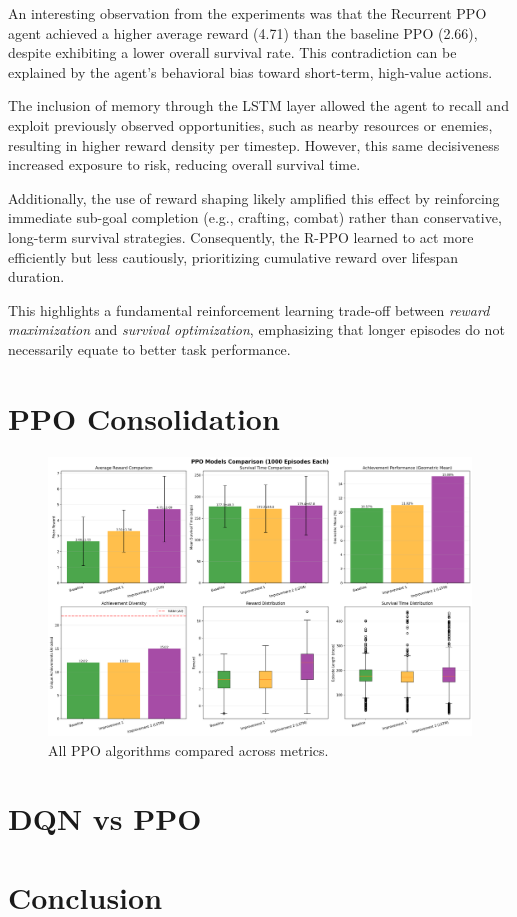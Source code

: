 \documentclass[twocolumn]{article}
\begin{document}
An interesting observation from the experiments was that the Recurrent PPO  agent achieved a higher average reward (4.71) than the baseline PPO (2.66), despite exhibiting a lower overall survival rate. This contradiction can be explained by the agent's behavioral bias toward short-term, high-value actions.

The inclusion of memory through the LSTM layer allowed the agent to recall and exploit previously observed opportunities, such as nearby resources or enemies, resulting in higher reward density per timestep. However, this same decisiveness increased exposure to risk, reducing overall survival time.

Additionally, the use of reward shaping likely amplified this effect by reinforcing immediate sub-goal completion (e.g., crafting, combat) rather than conservative, long-term survival strategies. Consequently, the R-PPO learned to act more efficiently but less cautiously, prioritizing cumulative reward over lifespan duration.

This highlights a fundamental reinforcement learning trade-off between \textit{reward maximization} and \textit{survival optimization}, emphasizing that longer episodes do not necessarily equate to better task performance.

\section*{PPO Consolidation}
\begin{figure}[H]
    \centering
    \includegraphics[width=0.75\linewidth]{images/final_comparison_1000_episodes.png}
    \caption{All PPO algorithms compared across metrics.}
    \label{fig:placeholder}
\end{figure}

\section*{DQN vs PPO}
\section*{Conclusion}
\printbibliography
\end{document}
